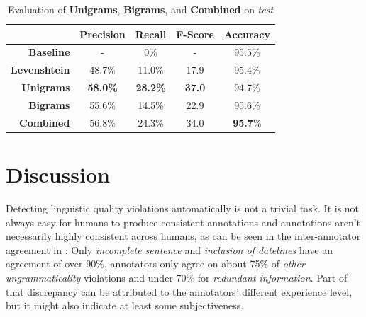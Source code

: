 \documentclass[a4paper,10pt]{scrartcl}
\theoremstyle{style}
\begin{document}
\begin{table}
\begin{center}
\begin{tabular}{|r|c|c|c|c|}
\hline
& Precision & Recall & F-Score & Accuracy\\
\hline
\textbf{Baseline} & - & 0\% & - & 95.5\% \\
\hline
\textbf{Levenshtein} & 48.7\% & 11.0\% & 17.9 & 95.4\%\\
\hline
\textbf{Unigrams} & \textbf{58.0\%} & \textbf{28.2\%} & \textbf{37.0} & 94.7\%\\
\hline
\textbf{Bigrams} & 55.6\% & 14.5\% & 22.9 & 95.6\%\\
\hline
\textbf{Combined} & 56.8\% & 24.3\% & 34.0 & \textbf{95.7}\%\\
\hline
\end{tabular}
\end{center}
\caption{Evaluation of \textbf{Unigrams}, \textbf{Bigrams}, and \textbf{Combined} on \textit{test}}
\label{eval_redundancy}
\end{table}





\newpage
\section{Discussion}
\label{discussion}
Detecting linguistic quality violations automatically is not a trivial task. It is not always easy for humans to produce consistent annotations and annotations aren't necessarily highly consistent across humans, as can be seen in the inter-annotator agreement in \cite{friedrichlqvsumm}: Only \textit{incomplete sentence} and \textit{inclusion of datelines} have an agreement of over 90\%, annotators only agree on about 75\% of \textit{other ungrammaticality} violations and under 70\% for \textit{redundant information}. Part of that discrepancy can be attributed to the annotators' different experience level, but it might also indicate at least some subjectiveness.
\end{document}
